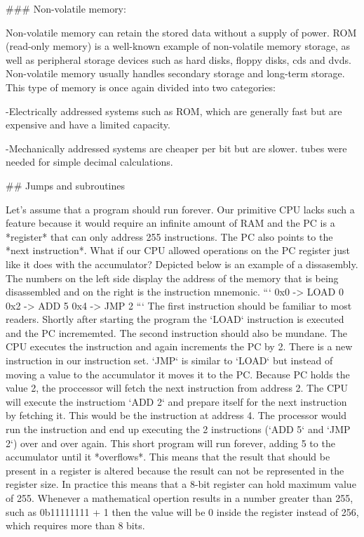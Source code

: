 ### Non-volatile memory:

Non-volatile memory can retain the stored data without a supply of power. ROM (read-only memory) is a well-known
example of non-volatile memory storage, as well as peripheral storage devices such as hard disks, floppy disks, cds and 
dvds. Non-volatile memory usually handles secondary storage and long-term storage. This type of memory is once again
divided into two categories:

-Electrically addressed systems such as ROM, which are generally fast but are expensive and
have a limited capacity. 

-Mechanically addressed systems are cheaper per bit but are slower. 
tubes were needed for simple decimal calculations. 


## Jumps and subroutines

Let's assume that a program should run forever. Our primitive CPU lacks such a feature because it
would require an infinite amount of RAM and the PC is a *register* that can only address 255 
instructions. The PC also points to the *next instruction*. What if our CPU allowed operations on
the PC register just like it does with the accumulator? Depicted below is an example of a 
dissasembly. The numbers on the left side display the address of the memory that is being
disassembled and on the right is the instruction mnemonic.
```
0x0 -> LOAD 0
0x2 -> ADD 5
0x4 -> JMP 2
```
The first instruction should be familiar to most readers. Shortly after starting the program the 
`LOAD` instruction is executed and the PC incrememted. The second instruction should also be mundane.
The CPU executes the instruction and again increments the PC by 2. There is a new instruction in our 
instruction set. `JMP` is similar to `LOAD` but instead of
moving a value to the accumulator it moves it to the PC. Because PC holds the value 2, the
proccessor will fetch the next instruction from address 2. The CPU will execute the instructiom
`ADD 2` and prepare itself for the next instruction by fetching it. This would be the instruction
at address 4. The processor would run the instruction and end up executing the 2 instructions
(`ADD 5` and `JMP 2`) over and over again. This short program will run forever, adding 5 to the
accumulator until it *overflows*. This means that the result that should be present in a register
is altered because the result can not be represented in the register size. In practice this means
that a 8-bit register can hold maximum value of 255. Whenever a mathematical opertion results in a 
number greater than 255, such as 0b11111111 + 1 then the value will be 0 inside the register instead
of 256, which requires more than 8 bits.

